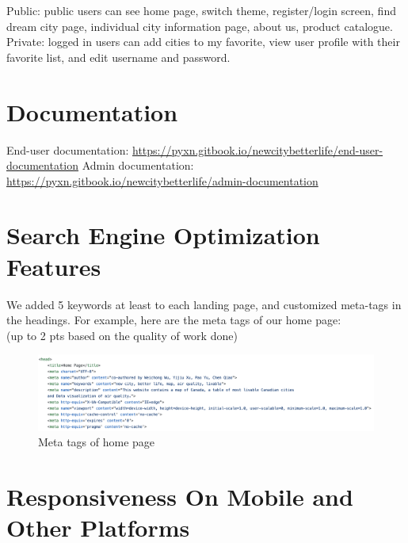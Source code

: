\documentclass[12pt, letterpaper]{article}
\begin{document}
Public: public users can see home page, switch theme, register/login screen, find dream city page, individual city information page, about us, product catalogue.
Private: logged in users can add cities to my favorite, view user profile with their favorite list, and edit username and password.

\section{Documentation}

End-user documentation:	\url{https://pyxn.gitbook.io/newcitybetterlife/end-user-documentation}
Admin documentation: \url{https://pyxn.gitbook.io/newcitybetterlife/admin-documentation}

\section{Search Engine Optimization Features}
We added 5 keywords at least to each landing page, and customized meta-tags in the headings.
For example, here are the meta tags of our home page:
\\(up to 2 pts based on the quality of work done)

\begin{figure}[htbp]
	\centering
	\includegraphics[width=6in]{images/q11.png}
	\caption{Meta tags of home page}
 \end{figure}

 \newpage

\section{Responsiveness On Mobile and Other Platforms}
\end{document}
